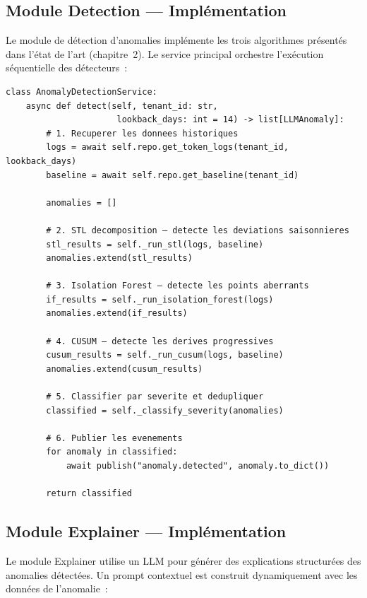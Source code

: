 \subsection{Module Detection --- Implémentation}

Le module de détection d'anomalies implémente les trois algorithmes présentés dans l'état de l'art (chapitre~2). Le service principal orchestre l'exécution séquentielle des détecteurs~:

\begin{lstlisting}[language=Python3, caption={Service de détection d'anomalies (modules/detection/services/detection\_service.py)}]
class AnomalyDetectionService:
    async def detect(self, tenant_id: str, 
                      lookback_days: int = 14) -> list[LLMAnomaly]:
        # 1. Recuperer les donnees historiques
        logs = await self.repo.get_token_logs(tenant_id, lookback_days)
        baseline = await self.repo.get_baseline(tenant_id)
        
        anomalies = []
        
        # 2. STL decomposition — detecte les deviations saisonnieres
        stl_results = self._run_stl(logs, baseline)
        anomalies.extend(stl_results)
        
        # 3. Isolation Forest — detecte les points aberrants
        if_results = self._run_isolation_forest(logs)
        anomalies.extend(if_results)
        
        # 4. CUSUM — detecte les derives progressives
        cusum_results = self._run_cusum(logs, baseline)
        anomalies.extend(cusum_results)
        
        # 5. Classifier par severite et dedupliquer
        classified = self._classify_severity(anomalies)
        
        # 6. Publier les evenements
        for anomaly in classified:
            await publish("anomaly.detected", anomaly.to_dict())
        
        return classified
\end{lstlisting}


\subsection{Module Explainer --- Implémentation}

Le module Explainer utilise un LLM pour générer des explications structurées des anomalies détectées. Un prompt contextuel est construit dynamiquement avec les données de l'anomalie~:

